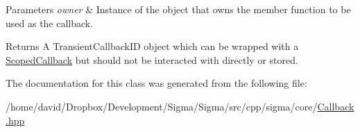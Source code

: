 \begin{DoxyParams}{Parameters}
{\em owner} & Instance of the object that owns the member function to be used as the callback.\\
\hline
\end{DoxyParams}
\begin{DoxyReturn}{Returns}
A Transient\-Callback\-I\-D object which can be wrapped with a \hyperlink{classsigma_1_1core_1_1_scoped_callback}{Scoped\-Callback} but should not be interacted with directly or stored. 
\end{DoxyReturn}


The documentation for this class was generated from the following file\-:\begin{DoxyCompactItemize}
\item 
/home/david/\-Dropbox/\-Development/\-Sigma/\-Sigma/src/cpp/sigma/core/\hyperlink{_callback_8hpp}{Callback.\-hpp}\end{DoxyCompactItemize}
